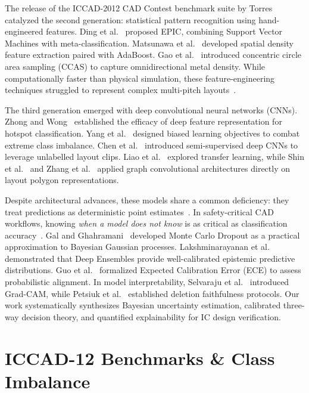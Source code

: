 \documentclass[11pt,journal,onecolumn]{IEEEtran}
\begin{document}
The release of the ICCAD-2012 CAD Contest benchmark suite by Torres~\cite{torres2012iccad} catalyzed the second generation: statistical pattern recognition using hand-engineered features. Ding et al.~\cite{ding2012epic} proposed EPIC, combining Support Vector Machines with meta-classification. Matsunawa et al.~\cite{matsunawa2015new} developed spatial density feature extraction paired with AdaBoost. Gao et al.~\cite{gao2013concentric} introduced concentric circle area sampling (CCAS) to capture omnidirectional metal density. While computationally faster than physical simulation, these feature-engineering techniques struggled to represent complex multi-pitch layouts~\cite{ye2019lithography}.

The third generation emerged with deep convolutional neural networks (CNNs). Zhong and Wong~\cite{zhong2016deep} established the efficacy of deep feature representation for hotspot classification. Yang et al.~\cite{yang2017imbalance} designed biased learning objectives to combat extreme class imbalance. Chen et al.~\cite{chen2020semi} introduced semi-supervised deep CNNs to leverage unlabelled layout clips. Liao et al.~\cite{liao2022lithography} explored transfer learning, while Shin et al.~\cite{shin2021machine} and Zhang et al.~\cite{zhang2021robust} applied graph convolutional architectures directly on layout polygon representations. 

Despite architectural advances, these models share a common deficiency: they treat predictions as deterministic point estimates~\cite{abdar2021review}. In safety-critical CAD workflows, knowing \textit{when a model does not know} is as critical as classification accuracy~\cite{kendall2017uncertainties}. Gal and Ghahramani~\cite{gal2016dropout} developed Monte Carlo Dropout as a practical approximation to Bayesian Gaussian processes. Lakshminarayanan et al.~\cite{lakshminarayanan2017simple} demonstrated that Deep Ensembles provide well-calibrated epistemic predictive distributions. Guo et al.~\cite{guo2017calibration} formalized Expected Calibration Error (ECE) to assess probabilistic alignment. In model interpretability, Selvaraju et al.~\cite{selvaraju2017grad} introduced Grad-CAM, while Petsiuk et al.~\cite{petsiuk2018rise} established deletion faithfulness protocols. Our work systematically synthesizes Bayesian uncertainty estimation, calibrated three-way decision theory, and quantified explainability for IC design verification.

\section{ICCAD-12 Benchmarks \& Class Imbalance}
\end{document}
